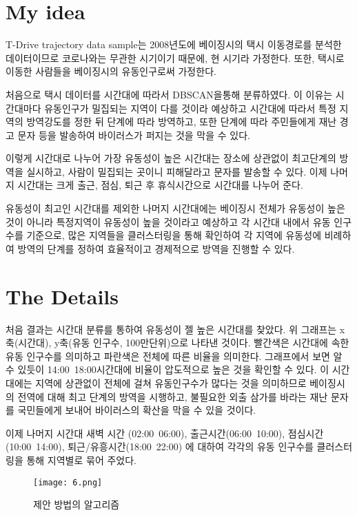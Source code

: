 \documentclass[10pt,journal,compsoc]{IEEEtran}
\begin{document}
\section{My idea}
T-Drive trajectory data sample는 2008년도에 베이징시의 택시 이동경로를 분석한 데이터이므로 코로나와는 무관한 시기이기 때문에, 현 시기라 가정한다. 또한, 택시로 이동한 사람들을 베이징시의 유동인구로써 가정한다.

처음으로 택시 데이터를 시간대에 따라서 DBSCAN을통해 분류하였다. 이 이유는 시간대마다 유동인구가 밀집되는 지역이 다를 것이라 예상하고 시간대에 따라서 특정 지역의 방역강도를 정한 뒤 단계에 따라 방역하고, 또한 단계에 따라 주민들에게 재난 경고 문자 등을 발송하여 바이러스가 퍼지는 것을 막을 수 있다.

이렇게 시간대로 나누어 가장 유동성이 높은 시간대는 장소에 상관없이 최고단계의 방역을 실시하고, 사람이 밀집되는 곳이니 피해달라고 문자를 발송할 수 있다. 이제 나머지 시간대는 크게 출근, 점심, 퇴근 후 휴식시간으로 시간대를 나누어 준다.

유동성이 최고인 시간대를 제외한 나머지 시간대에는 베이징시 전체가 유동성이 높은 것이 아니라 특정지역이 유동성이 높을 것이라고 예상하고 각 시간대 내에서 유동 인구수를 기준으로, 많은 지역들을 클러스터링을 통해 확인하여 각 지역에 유동성에 비례하여 방역의 단계를 정하여 효율적이고 경제적으로 방역을 진행할 수 있다. 
 
\section{The Details}
처음 결과는 시간대 분류를 통하여 유동성이 젤 높은 시간대를 찾았다.
위 그래프는 x축(시간대), y축(유동 인구수, 100만단위)으로 나타낸 것이다. 빨간색은 시간대에 속한 유동 인구수를 의미하고 파란색은 전체에 따른 비율을 의미한다. 그래프에서 보면 알 수 있듯이 14:00~18:00시간대에 비율이 압도적으로 높은 것을 확인할 수 있다. 이 시간대에는 지역에 상관없이 전체에 걸쳐 유동인구수가 많다는 것을 의미하므로 베이징시의 전역에 대해 최고 단계의 방역을 시행하고, 불필요한 외출 삼가를 바라는 재난 문자를 국민들에게 보내어 바이러스의 확산을 막을 수 있을 것이다.

이제 나머지 시간대 새벽 시간  (02:00~06:00), 출근시간(06:00~10:00), 점심시간(10:00~14:00), 퇴근/유흥시간(18:00~22:00) 에 대하여 각각의 유동 인구수를 클러스터링을 통해 지역별로 묶어 주었다. 
\begin{figure}[htp] 
    \centering
    \texttt{[image: 6.png]} 
    \caption{제안 방법의 알고리즘} 
    \label{fig:4} 
\end{figure}
\end{document}
